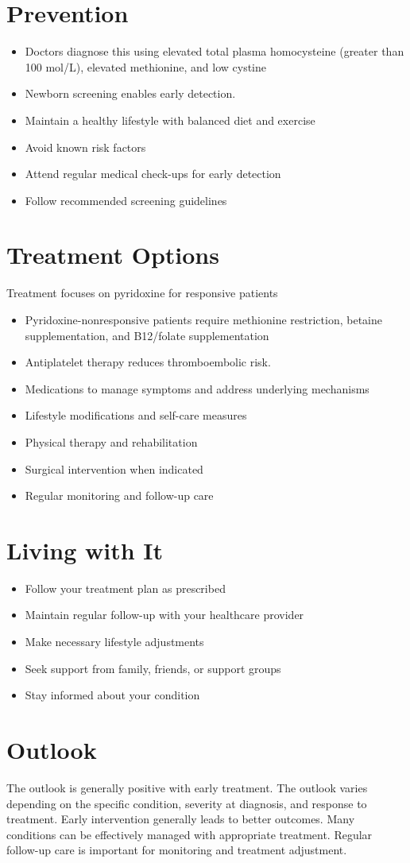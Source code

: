 \section{Prevention}
\begin{itemize}[noitemsep]
  \item Doctors diagnose this using elevated total plasma homocysteine (greater than 100 \textmu mol/L), elevated methionine, and low cystine
  \item Newborn screening enables early detection.
  \item Maintain a healthy lifestyle with balanced diet and exercise
  \item Avoid known risk factors
  \item Attend regular medical check-ups for early detection
  \item Follow recommended screening guidelines
\end{itemize}
\section{Treatment Options}
Treatment focuses on pyridoxine for responsive patients

\begin{itemize}[noitemsep]
  \item Pyridoxine-nonresponsive patients require methionine restriction, betaine supplementation, and B12/folate supplementation
  \item Antiplatelet therapy reduces thromboembolic risk.
  \item Medications to manage symptoms and address underlying mechanisms
  \item Lifestyle modifications and self-care measures
  \item Physical therapy and rehabilitation
  \item Surgical intervention when indicated
  \item Regular monitoring and follow-up care
\end{itemize}
\section{Living with It}
\begin{itemize}[noitemsep]
  \item Follow your treatment plan as prescribed
  \item Maintain regular follow-up with your healthcare provider
  \item Make necessary lifestyle adjustments
  \item Seek support from family, friends, or support groups
  \item Stay informed about your condition
\end{itemize}
\section{Outlook}
The outlook is generally positive with early treatment. The outlook varies depending on the specific condition, severity at diagnosis, and response to treatment. Early intervention generally leads to better outcomes. Many conditions can be effectively managed with appropriate treatment. Regular follow-up care is important for monitoring and treatment adjustment.
